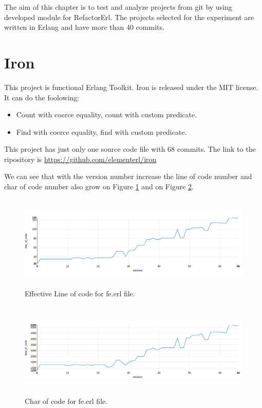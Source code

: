 The aim of this chapter is to test and analyze projects from git by using developed module for RefactorErl. The projects selected for the experiment are written in Erlang and have more than 40 commits.

\section{Iron}

This project is functional Erlang Toolkit. Iron is released under the MIT license. It can do the foolowing:
\begin{itemize}
	\item Count with coerce equality, count with custom predicate.
	\item Find with coerce equality, find with custom predicate.
\end{itemize}

This project has just only one source code file with 68 commits. The link to the ripository is \url{https://github.com/elementerl/iron}

We can see that with the version number increase the line of code number and char of code number also grow on Figure \ref{fig:loc_iron} and on Figure \ref{fig:char_iron}.

\begin{figure}[h]
	\centering
	\includegraphics[height=45mm]{figures/loc_iron.png}
	\caption{Effective Line of code for fe.erl file.}
	\label{fig:loc_iron}
\end{figure}

\begin{figure}[h]
	\centering
	\includegraphics[height=45mm]{figures/char_iron.png}
	\caption{Char of code for fe.erl file.}
	\label{fig:char_iron}
\end{figure}

